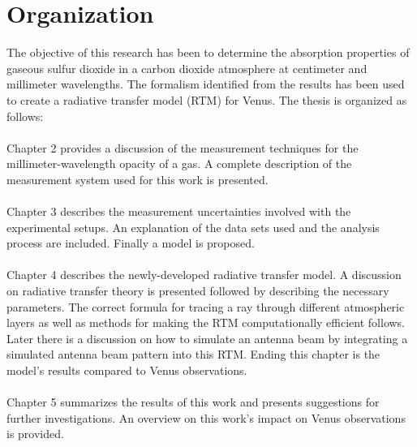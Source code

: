 \section{Organization}
The objective of this research has been to determine the absorption properties of gaseous sulfur dioxide in a carbon dioxide atmosphere at centimeter and millimeter wavelengths. The formalism identified from the results has been used to create a radiative transfer model (RTM) for Venus. The thesis is organized as follows:
\\ \\
\noindent Chapter 2 provides a discussion of the measurement techniques for the millimeter-wavelength opacity of a gas. A complete description of the measurement system used for this work is presented.
\\ \\
\noindent Chapter 3 describes the measurement uncertainties involved with the experimental setups. An explanation of the data sets used and the analysis process are included. Finally a model is proposed.
\\ \\
\noindent Chapter 4 describes the newly-developed radiative transfer model. A discussion on radiative transfer theory is presented followed by describing the necessary parameters. The correct formula for tracing a ray through different atmospheric layers as well as methods for making the RTM computationally efficient follows. Later there is a discussion on how to simulate an antenna beam by integrating a simulated antenna beam pattern into this RTM. Ending this chapter is the model's results compared to Venus observations.
\\ \\
\noindent Chapter 5 summarizes the results of this work and presents suggestions for further investigations. An overview on this work's impact on Venus observations is provided.
